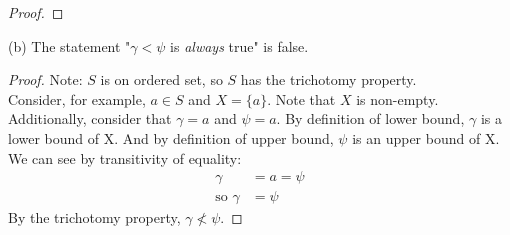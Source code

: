 \documentclass{amsart}
\begin{document}
\begin{enumerate}[1.]
\begin{proof}
\end{proof}
(b) The statement "$\gamma<\psi$ is \emph{always} true" is false.
\begin{proof}
Note: $S$ is on ordered set, so $S$ has the trichotomy property. \\
Consider, for example, $a\in S$ and $X = \{a\}$. Note that $X$ is non-empty.
Additionally, consider that $\gamma = a$ and $\psi = a$.
By definition of lower bound, $\gamma$ is a lower bound of X.
And by definition of upper bound, $\psi$ is an upper bound of X.
We can see by transitivity of equality:
\begin{align*}
    \gamma &= a = \psi \\
    \text{so } \gamma &= \psi
\end{align*}
By the trichotomy property, $ \gamma \nless \psi$.
\end{proof}

\end{enumerate}
\end{document}
